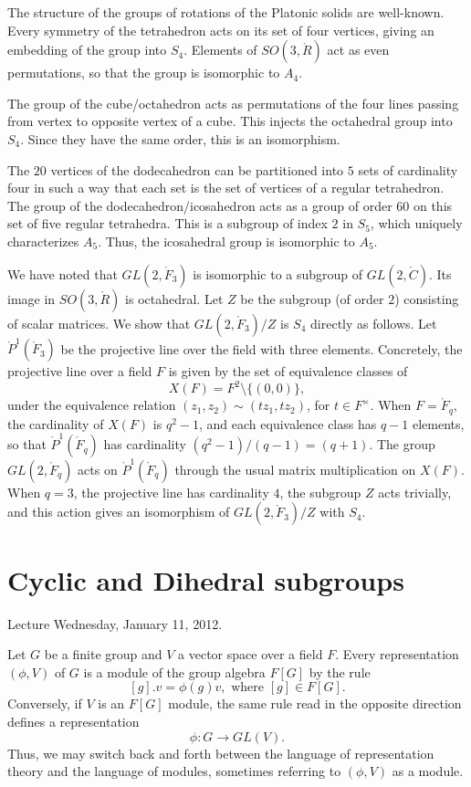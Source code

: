 \documentclass{amsart}
\begin{document}
The structure of the groups of rotations of the Platonic solids are well-known.
Every symmetry of the tetrahedron acts on its set of four vertices, giving
an embedding of the group into $S_4$.  Elements of $SO(3,\ring{R})$ act as
even permutations, so that the group is isomorphic to $A_4$.

The group of the cube/octahedron acts as permutations of the four lines passing
from vertex to opposite vertex of a cube.  This injects the octahedral group
into $S_4$.  Since they have the same order, this is an isomorphism.

The $20$ vertices of the dodecahedron can be partitioned into $5$ sets of cardinality
four in such a way that each set is the set of vertices of a regular tetrahedron.
The group of the dodecahedron/icosahedron acts as a group of order $60$ 
on this set of five
regular tetrahedra.  This is a subgroup of index $2$ in $S_5$, which uniquely
characterizes  $A_5$.  Thus, the icosahedral group is isomorphic to $A_5$.

We have noted that $GL(2,\ring{F}_3)$ is isomorphic to a subgroup of
$GL(2,\ring{C})$.  Its image in $SO(3,\ring{R})$ is octahedral.  Let
$Z$ be the subgroup (of order $2$) consisting of scalar matrices.  We
show that $GL(2,\ring{F}_3)/Z$ is $S_4$ directly as follows.  Let
$\ring{P}^1(\ring{F}_3)$ be the projective line over the field with
three elements.  Concretely, the projective line over a field $F$ is
given by the set of equivalence classes of
\[
X(F)=F^2 \setminus \{(0,0)\},
\]
under the equivalence relation $(z_1,z_2)\sim (t z_1,t z_2)$, for
$t\in F^\times$.  When $F=\ring{F}_q$, the cardinality of $X(F)$ is
$q^2-1$, and each equivalence class has $q-1$ elements, so that
$\ring{P}^1(\ring{F}_q)$ has cardinality $(q^2-1)/(q-1)=(q+1)$.  The
group $GL(2,\ring{F}_q)$ acts on $\ring{P}^1(\ring{F}_q)$ through the
usual matrix multiplication on $X(F)$.  When $q=3$, the projective
line has cardinality $4$, the subgroup $Z$ acts trivially, and this
action gives an isomorphism of $GL(2,\ring{F}_3)/Z$ with $S_4$.


\newpage
\section{Cyclic and Dihedral subgroups}

Lecture Wednesday, January 11, 2012.


Let $G$ be a finite group and $V$ a vector space over a field $F$.  
Every representation $(\phi,V)$ of $G$
is a module of the group algebra $F[G]$ by the rule 
\[
[g].v = \phi(g)v, \text{ where } [g]\in F[G].
\]
Conversely, if $V$ is an $F[G]$ module, the same rule read in the opposite
direction defines a representation
\[
\phi:G\to GL(V).
\]
Thus, we may switch back and forth between the language of representation
theory and the language of modules, sometimes referring to $(\phi,V)$ as
a module.
\end{document}
